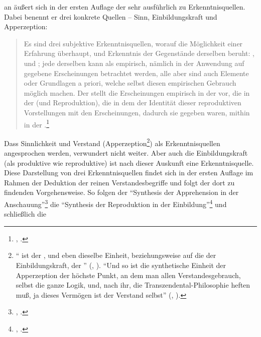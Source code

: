  an äußert sich in der
ersten Auflage der  sehr ausführlich zu
Erkenntnisquellen. Dabei benennt er drei konkrete Quellen -- Sinn,
Einbildungskraft und Apperzeption:
\begin{quote}
Es sind drei subjektive Erkenntnisquellen, worauf die Möglichkeit einer
Erfahrung überhaupt, und Erkenntnis der Gegenstände derselben beruht:
,  und ; jede derselben kann
als empirisch, nämlich in der Anwendung auf gegebene Erscheinungen betrachtet
werden, alle aber sind auch Elemente oder Grundlagen a priori, welche selbst
diesen empirischen Gebrauch möglich machen. Der  stellt die
Erscheinungen empirisch in der  vor, die 
in der  (und Reproduktion), die  in dem
 der Identität dieser reproduktiven Vorstellungen
mit den Erscheinungen, dadurch sie gegeben waren, mithin in der
.\footnote{\cite[][A 115]{Kant:KritikderreinenVernunft2003},
\cite[][IV: 86.16--27]{Kant:GesammelteWerke1900ff.}.}
\end{quote}
Dass Sinnlichkeit und Verstand (Apperzeption\footnote{\enquote{
ist der , und eben dieselbe Einheit, beziehungsweise auf die
 der Einbildungskraft, der }
\mkbibparens{\cite[][A 119]{Kant:KritikderreinenVernunft2003},
\cite[][IV: 88.22--25]{Kant:GesammelteWerke1900ff.}}. \enquote{Und so ist die
synthetische Einheit der Apperzeption der höchste Punkt, an dem man allen Verstandesgebrauch, selbst die ganze Logik, und, nach ihr, die Transzendental-Philosophie heften muß, ja dieses Vermögen ist der Verstand selbst} \mkbibparens{\cite[][B 134]{Kant:KritikderreinenVernunft2003}, \cite[][III: 109.35--39]{Kant:GesammelteWerke1900ff.}}.}) als Erkenntnisquellen angesprochen werden, verwundert nicht weiter.
Aber auch die Einbildungskraft (als produktive wie reproduktive) ist nach dieser Auskunft eine Erkenntnisquelle. Diese
Darstellung von drei Erkenntnisquellen findet sich in der ersten Auflage im
Rahmen der Deduktion der reinen Verstandesbegriffe und folgt der dort zu
findenden Vorgehensweise. So folgen der \enquote{Synthesis der Apprehension in
der Anschauung}\footnote{\cite[][A 98]{Kant:KritikderreinenVernunft2003},
\cite[][IV: 77.2]{Kant:GesammelteWerke1900ff.}.} die \enquote{Synthesis der
Reproduktion in der Einbildung}\footnote{\cite[][A 100]{Kant:KritikderreinenVernunft2003},
\cite[][IV: 77.32]{Kant:GesammelteWerke1900ff.}.} und schließlich die
